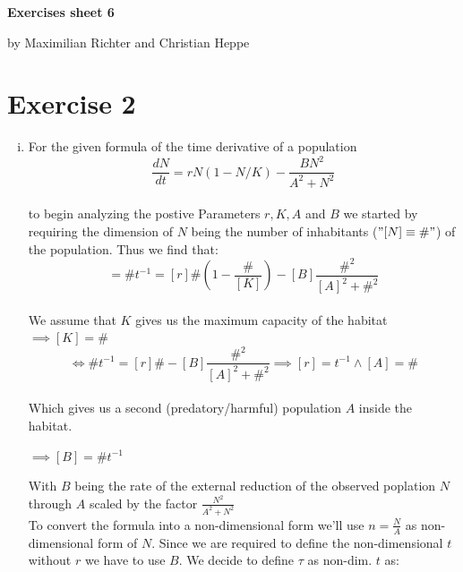 \documentclass[12pt,a4paper]{article}
\begin{document}
\centerline{\LARGE \textbf{Exercises sheet 6}}\vspace{0.5em}
\centerline{\large by Maximilian Richter and Christian Heppe}\vspace{2em}

\section*{Exercise 2}

\begin{enumerate}[i)]
	\item For the given formula of the time derivative of a population\\
	\begin{equation} 
	\frac{dN}{dt}=rN(1-N/K)-\frac{BN^2}{A^2+N^2}  
	\end{equation}\\ 
	to begin analyzing the postive Parameters $r, K, A$ and $B$ we started by requiring the dimension of $N$ being the number of inhabitants ($"[N]\equiv\#"$) of the population. Thus we find that:\\
	\begin{equation}
		[\frac{dN}{dt}]=\#t^{-1}=[r]\#(1-\frac{\#}{[K]})-[B]\frac{\#^2}{[A]^2+\#^2}
	\end{equation}\\ 
	We assume that $K$ gives us the maximum capacity of the habitat $\implies [K]=\#$ 
	\begin{equation}
		\Leftrightarrow \#t^{-1}=[r]\#-[B]\frac{\#^2}{[A]^2+\#^2}
		\implies [r]=t^{-1} \land [A]=\#
	\end{equation}\\ 
	Which gives us a second (predatory/harmful) population $A$ inside the habitat.
	\begin{center}
		$\implies [B]=\#t^{-1}$
	\end{center}
	With $B$ being the rate of the external reduction of the observed poplation $N$ through $A$ scaled by the factor $\frac{N^2}{A^2+N^2}$\\ 
	To convert the formula into a non-dimensional form we'll use $n=\frac{N}{A}$ as non-dimensional form of $N$. Since we are required to define the non-dimensional $t$ without $r$ we have to use $B$. We decide to define $\tau$ as non-dim. $t$ as:\\
	\begin{equation}

\end{equation}
\end{enumerate}
\end{document}
